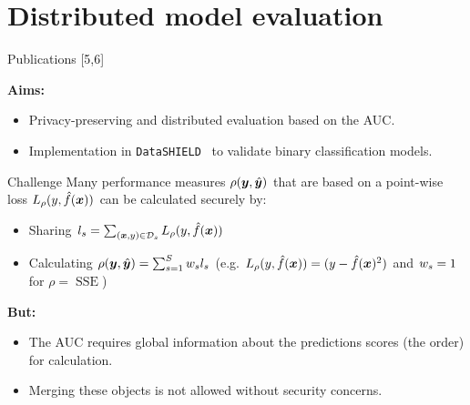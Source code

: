 \documentclass[t,10pt]{beamer}
\begin{document}
\section*{Distributed model evaluation}

\begin{frame}{Publications [5,6]}
  \vspace{-0.2cm}
  \begin{figure}
    \centering
  \end{figure}
  \vspace{-0.4cm}

  \textbf{Aims:}
  \begin{itemize}
    \item
      Privacy-preserving and distributed evaluation based on the AUC.
    \item
      Implementation in \texttt{DataSHIELD}~\citep{gaye2014datashield} to validate binary classification models.
  \end{itemize}
\end{frame}

\begin{frame}{Challenge}
  Many performance measures $\rho(\bm{y}, \hat{\bm{y}})$ that are based on a point-wise loss $L_\rho(y, \hat{f}(\bm{x}))$ can be calculated securely by:
  \begin{itemize}
    \item Sharing $l_s = \sum_{(\bm{x}, y)\in\mathcal{D}_s} L_\rho(y,\hat{f}(\bm{x}))$
    \item Calculating $\rho(\bm{y},\hat{\bm{y}}) = \sum_{s=1}^S w_s l_s$ (e.g. $L_\rho(y,\hat{f}(\bm{x})) = (y - \hat{f}(\bm{x})^2)$ and $w_s = 1$ for $\rho = \operatorname{SSE}$)
  \end{itemize}
\textbf{But:}
  \begin{itemize}
    \item The AUC requires global information about the predictions scores (the order) for calculation.
    \item Merging these objects is not allowed without security concerns.
  \end{itemize}
\end{frame}
\end{document}
